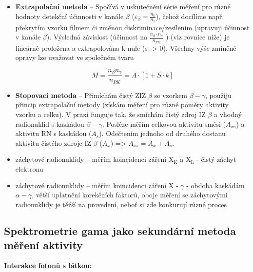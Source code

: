 \begin{itemize}
    \item \textbf{Extrapolační metoda} -- Spočívá v uskutečnění série měření pro různé hodnoty detekční účinnosti v kanále $\beta$ ($\varepsilon_\beta = \frac{n_k}{n_\gamma}$), čehož docílíme např. překrytím vzorku filmem či změnou diskriminace/zesílením (upravuji účinnost v kanále $\beta$). Výsledná závislost (účinnost na $\frac{n_\beta \cdot n_\gamma}{n_{PK}}$ ) (viz rovnice níže) je lineárně proložena a extrapolována k nule (s -> 0). Všechny výše zmíněné opravy lze uvažovat ve společném tvaru 
    
    $$M = \dfrac{n_{\beta} n_{\gamma}}{n_{PK}} = A \cdot [1 + S\cdot k] $$

    \item \textbf{Stopovací metoda} -- Přimíchám čistý ZIZ $\beta$ se vzorkem $\beta-\gamma$, použiju přincip extrapolační metody (získám měření pro různé poměry aktivity vzorku a celku). V praxi funguje tak, že smíchám čistý zdroj IZ $\beta$ a vhodný radionuklid s kaskádou $\beta - \gamma$. Posléze měřím celkovou aktivitu směsi ($A_{xs}$) a aktivitu RN s kaskádou ($A_s$). Odečtením jednoho od druhého dostanu aktivitu čistého zdroje IZ $\beta$ ($A_x$) => $A_{xs} = A_x + A_s$.
    
    \item záchytové radionuklidy -- měřím koincidenci záření X$_{\text{K}}$ a X$_{\text{L}}$ - čistý záchyt elektronu
    \item záchytové radionuklidy -- měřím koincidenci záření X - $\gamma$ - obdoba kaskádám $\alpha - \gamma$, větší uplatnění korekčních faktorů, oboje měření se záchytovými radionuklidy je těžší na provedení, neboť si zde konkurují různé proces
\end{itemize}

\subsection{Spektrometrie gama jako sekundární metoda měření aktivity}

\textbf{Interakce fotonů s látkou:}

